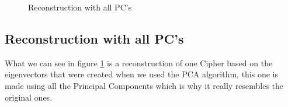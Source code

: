 \documentclass[paper=a4, fontsize=11pt]{scrartcl} %
\begin{document}
\clearpage
\begin{figure}[h]
    \centering
    \caption{Reconstruction with all PC's}
    \label{fig:reconFull}
\end{figure}

\subsection{Reconstruction with all PC's}
What we can see in figure \ref{fig:reconFull} is a reconstruction of one Cipher based on the eigenvectors that were created when we used the PCA algorithm, this one is made using all the Principal Components which is why it really resembles the original ones.
\end{document}
